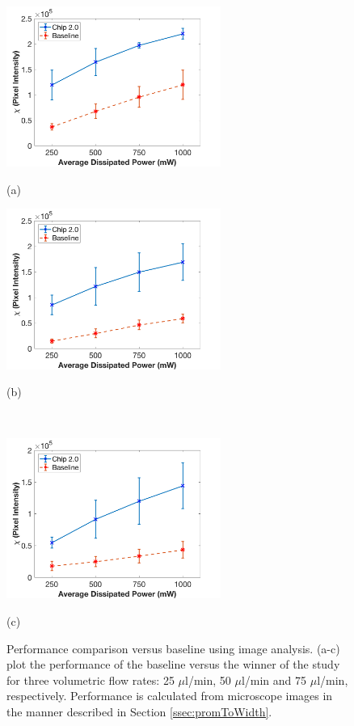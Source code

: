 \begin{figure}[H]
  \begin{minipage}[t]{0.49\linewidth}\centering
    \includegraphics[width=7cm]{ErrorBars25ul}
    \medskip
    \centerline{(a)}
  \end{minipage}\hfill
  \begin{minipage}[t]{0.49\linewidth}\centering
    \includegraphics[width=7cm]{ErrorBars50ul}
    \medskip
    \centerline{(b)}\\
  \end{minipage}
  \begin{minipage}[t]{0.99\linewidth}\centering
    \includegraphics[width=7cm]{ErrorBars75ul}
    \medskip
    \centerline{(c)}
  \end{minipage}
  \caption[Performance Comparison Versus Baseline using Image Analysis]{Performance comparison versus baseline using image analysis. (a-c) plot the performance of the baseline versus the winner of the study for three volumetric flow rates: 25 $\mu$l/min, 50 $\mu$l/min and 75 $\mu$l/min, respectively. Performance is calculated from microscope images in the manner described in Section \ref{ssec:promToWidth}.}
	\label{fig:headToHeadImages}
\end{figure}

